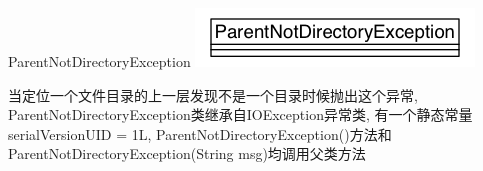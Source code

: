 \begin{XeClass}{ParentNotDirectoryException}
\includegraphics[width=\textwidth]{cdig/ParentNotDirectoryException.png}
     
 当定位一个文件目录的上一层发现不是一个目录时候抛出这个异常,
 ParentNotDirectoryException类继承自IOException异常类,
 有一个静态常量serialVersionUID = 1L,
 ParentNotDirectoryException()方法和ParentNotDirectoryException(String msg)均调用父类方法

\end{XeClass}
